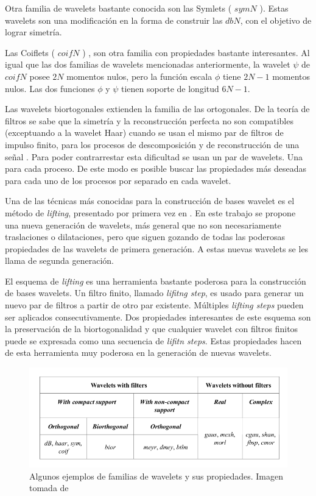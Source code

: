 Otra familia de wavelets bastante conocida son las Symlets ( $symN$ ). Estas wavelets son una modificación en la forma
de construir las $dbN$, con el objetivo de lograr simetría.

Las Coiflets ( $coifN$ ) \cite{daubechies1992}, son otra familia con propiedades bastante interesantes. Al igual que las dos familias de 
wavelets mencionadas anteriormente, la wavelet $\psi$ de $coifN$ posee $2N$ momentos nulos, pero la función escala
$\phi$ tiene $2N-1$ momentos nulos. Las dos funciones $\phi$ y $\psi$ tienen soporte de longitud $6N-1$.

Las wavelets biortogonales extienden la familia de las ortogonales. De la teoría de filtros se sabe que
la simetría y la reconstrucción perfecta no son compatibles (exceptuando a la wavelet Haar)
cuando se usan el mismo par de filtros de impulso finito, para los procesos 
de descomposición y de reconstrucción de una señal \cite{misiti2007wavelets}. Para poder contrarrestar esta dificultad se usan un par de
wavelets. Una para cada proceso. De este modo es posible buscar las propiedades más deseadas para cada uno de
los procesos por separado en cada wavelet.

Una de las técnicas más conocidas para la construcción de bases wavelet es el método de \textit{lifting}, presentado
por primera vez en \cite{lifting}. En este trabajo se propone una nueva generación de wavelets, más general que no son necesariamente traslaciones 
o dilataciones, pero que siguen gozando de todas las poderosas propiedades de las wavelets de primera generación.
A estas nuevas wavelets se les llama de segunda generación. 

El esquema de \textit{lifting} es una herramienta  bastante poderosa para la construcción de bases wavelets. 
Un filtro finito, llamado \textit{lifitng step}, es usado para 
generar un nuevo par de filtros a partir de otro par existente. Múltiples \textit{lifting steps} pueden ser aplicados
consecutivamente. Dos propiedades interesantes de este esquema son la preservación de la biortogonalidad
y que cualquier wavelet con filtros finitos puede se expresada como una secuencia de \textit{lifitn steps}.
Estas propiedades hacen de esta herramienta muy poderosa en la generación de nuevas wavelets.

\begin{figure}
	\centering
	\includegraphics[scale=0.5]{Graphics/wavelet-properties.png}
	\caption{Algunos ejemplos de familias de wavelets y sus propiedades. Imagen tomada de \cite{misiti2007wavelets}}\label{fig:wavelets-properties}
\end{figure}

